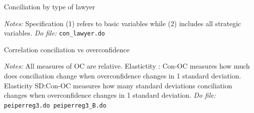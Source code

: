 \documentclass[11pt]{article}
\begin{document}
\begin{table}[H]
    \caption{Conciliation by type of lawyer}
    \label{tab:reg_con_oc}
    \begin{center}
        \scriptsize{}
    \end{center}
    \footnotesize
    \textit{Notes:} 
   Specification (1) refers to basic variables while (2) includes all strategic variables.
    \textit{Do file: } \texttt{con\_lawyer.do}
\end{table} 

\begin{landscape}






\end{landscape}


\begin{table}[H]
    \caption{Correlation conciliation vs overconfidence}
    \label{Table_concvsoc}
    \begin{center}
        \scriptsize{}
    \end{center}
    \footnotesize
    \textit{Notes:} 
    All measures of OC are relative. Elastictity : Con-OC measures how much does conciliation change when overconfidence changes in 1 standard deviation. Elasticity SD:Con-OC measures how many standard deviations conciliation changes when  overconfidence changes in 1 standard deviation.
    \textit{Do file: } \texttt{peiperreg3.do peiperreg3\_B.do}
\end{table}
\end{document}
